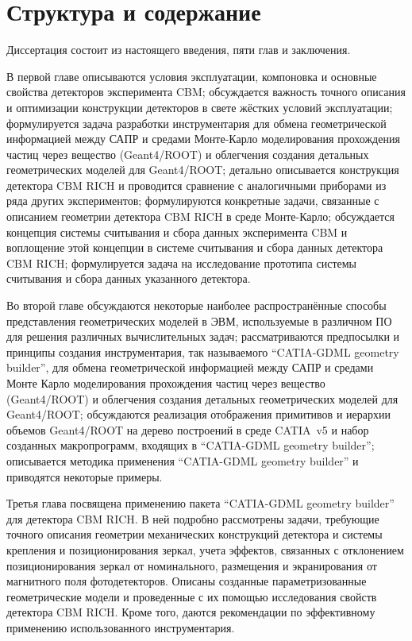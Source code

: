 \section*{Структура и содержание}\label{sec:secStructureAndContent}

Диссертация состоит из настоящего введения, пяти глав и заключения.

В первой главе
описываются условия эксплуатации, компоновка и основные свойства детекторов эксперимента CBM;
обсуждается важность точного описания и оптимизации конструкции детекторов в свете жёстких условий эксплуатации;
формулируется задача разработки инструментария для обмена геометрической информацией между САПР и средами Монте-Карло моделирования прохождения частиц через вещество (Geant4/ROOT) и облегчения создания детальных геометрических моделей для Geant4/ROOT;
детально описывается конструкция детектора CBM RICH и проводится сравнение с аналогичными приборами из ряда других экспериментов;
формулируются конкретные задачи, связанные с описанием геометрии детектора CBM RICH в среде Монте-Карло;
обсуждается концепция системы считывания и сбора данных эксперимента CBM и воплощение этой концепции в системе считывания и сбора данных детектора CBM RICH;
формулируется задача на исследование прототипа системы считывания и сбора данных указанного детектора.

Во второй главе
обсуждаются некоторые наиболее распространённые способы представления геометрических моделей в ЭВМ, используемые в различном ПО для решения различных вычислительных задач;
рассматриваются предпосылки и принципы создания инструментария, так называемого ``CATIA-GDML geometry builder'', для обмена геометрической информацией между САПР и средами Монте Карло моделирования прохождения частиц через вещество (Geant4/ROOT) и облегчения создания детальных геометрических моделей для Geant4/ROOT;
обсуждаются реализация отображения примитивов и иерархии объемов Geant4/ROOT на дерево построений в среде CATIA~v5 и набор созданных макропрограмм, входящих в ``CATIA-GDML geometry builder'';
описывается методика применения ``CATIA-GDML geometry builder'' и приводятся некоторые примеры.

Третья глава
посвящена применению пакета ``CATIA-GDML geometry builder'' для детектора CBM RICH. В ней подробно рассмотрены задачи, требующие точного описания геометрии механических конструкций детектора и системы крепления и позиционирования зеркал, учета эффектов, связанных с отклонением позиционирования зеркал от номинального, размещения и экранирования от магнитного поля фотодетекторов. Описаны созданные параметризованные геометрические модели и проведенные с их помощью исследования свойств детектора CBM RICH. Кроме того, даются рекомендации по эффективному применению использованного инструментария.

